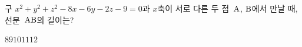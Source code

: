 구 $x^2+y^2+z^2-8x-6y-2z-9=0$과 $x$축이 서로 다른 두 점~$\mathrm{A}$, $\mathrm{B}$에서 만날 때, 선분~$\mathrm{AB}$의 길이는?
\begin{choices32}{$8$}{$9$}{$10$}{$11$}{$12$}\end{choices32}
